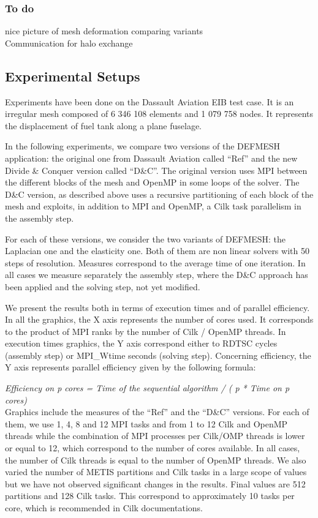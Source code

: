 \documentclass{IOS-Book-Article}
\begin{document}
\subsubsection{To do}
nice picture of mesh deformation comparing variants\\
Communication for halo exchange\\

\subsection{Experimental Setups}
Experiments have been done on the Dassault Aviation EIB test case. It is an irregular mesh composed of 6 346 108 elements and 1 079 758 nodes.
It represents the displacement of fuel tank along a plane fuselage.

In the following experiments, we compare two versions of the DEFMESH application: the original one from Dassault Aviation called “Ref” and the new
Divide \& Conquer version called “D\&C”. The original version uses MPI between the different blocks of the mesh and OpenMP in some loops of the solver.
The D\&C version, as described above uses a recursive partitioning of each block of the mesh and exploits, in addition to MPI and OpenMP, a Cilk task parallelism
in the assembly step.

For each of these versions, we consider the two variants of DEFMESH: the Laplacian one and the elasticity one.
Both of them are non linear solvers with 50 steps of resolution. Measures correspond to the average time of one iteration.
In all cases we measure separately the assembly step, where the D\&C approach has been applied and the solving step, not yet modified.

We present the results both in terms of execution times and of parallel efficiency.
In all the graphics, the X axis represents the number of cores used. It corresponds to the product of MPI ranks by the number of Cilk / OpenMP threads.
In execution times graphics, the Y axis correspond either to RDTSC cycles (assembly step) or MPI\_Wtime seconds (solving step).
Concerning efficiency, the Y axis represents parallel efficiency given by the following formula:

\emph{Efficiency on p cores = Time of the sequential algorithm / ( p * Time on p cores)}\\

Graphics include the measures of the “Ref” and the “D\&C” versions.
For each of them, we use 1, 4, 8 and 12 MPI tasks and from 1 to 12 Cilk and OpenMP threads while the combination of MPI processes per Cilk/OMP threads is lower or equal to 12,
which correspond to the number of cores available. In all cases, the number of Cilk threads is equal to the number of OpenMP threads.
We also varied the number of METIS partitions and Cilk tasks in a large scope of values but we have not observed significant changes in the results.
Final values are 512 partitions and 128 Cilk tasks. This correspond to approximately 10 tasks per core, which is recommended in Cilk documentations.
\end{document}
